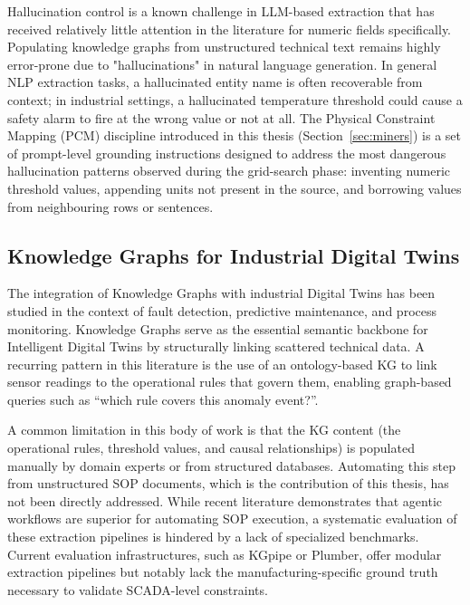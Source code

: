 ﻿\documentclass[11pt]{article}
\begin{document}
Hallucination control is a known challenge in LLM-based extraction that has
received relatively little attention in the literature for numeric fields
specifically. Populating knowledge graphs from unstructured technical text remains highly error-prone due to "hallucinations" in natural language generation.
In general NLP extraction tasks, a hallucinated entity name is often recoverable
from context; in industrial settings, a hallucinated temperature threshold could
cause a safety alarm to fire at the wrong value or not at all.
The Physical Constraint Mapping (PCM) discipline introduced in this thesis
(Section~\ref{sec:miners}) is a set of prompt-level grounding instructions
designed to address the most dangerous hallucination patterns observed during the
grid-search phase: inventing numeric threshold values, appending units not
present in the source, and borrowing values from neighbouring rows or sentences.

\subsection{Knowledge Graphs for Industrial Digital Twins}
\label{sec:rw_dt_kg}

The integration of Knowledge Graphs with industrial Digital Twins has been
studied in the context of fault detection, predictive maintenance, and process
monitoring. Knowledge Graphs serve as the essential semantic backbone for Intelligent Digital Twins by structurally linking scattered technical data.
A recurring pattern in this literature is the use of an ontology-based KG
to link sensor readings to the operational rules that govern them, enabling
graph-based queries such as ``which rule covers this anomaly event?''.

A common limitation in this body of work is that the KG content (the
operational rules, threshold values, and causal relationships) is populated
manually by domain experts or from structured databases.
Automating this step from unstructured SOP documents, which is the contribution
of this thesis, has not been directly addressed.
While recent literature demonstrates that agentic workflows are superior for automating SOP execution, a systematic evaluation of these extraction pipelines is hindered by a lack of specialized benchmarks. Current evaluation infrastructures, such as KGpipe or Plumber, offer modular extraction pipelines but notably lack the manufacturing-specific ground truth necessary to validate SCADA-level constraints.
\end{document}
